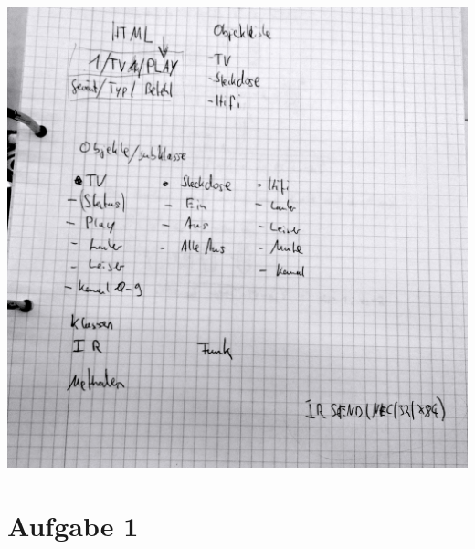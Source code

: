 \documentclass[10pt]{article}
\newcommand{\mylisting}[2][]{%
}
\begin{document}
\includegraphics[width=\textwidth]{images/Stuktur-Sketch.jpg}





\section{Aufgabe 1}
	\mylisting[language=C]{../code/InfraredProxy/InfraredProxy.ino}
\end{document}
